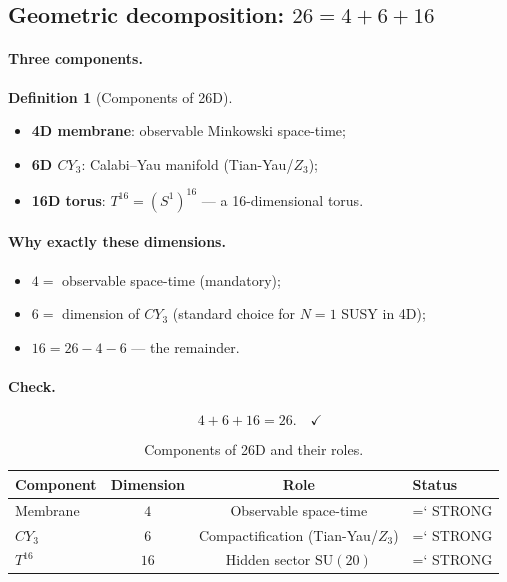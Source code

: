 \documentclass[11pt,a4paper]{article}
\newcommand{\SU}{\mathrm{SU}}
\newcommand{\CY}{CY_3}
\renewcommand{\texttt}[1]{{\ttfamily\hyphenchar\font=`\- #1}}
\theoremstyle{definition}
\newtheorem{definition}[theorem]{Definition}
\begin{document}
\subsection{Geometric decomposition: $26 = 4 + 6 + 16$}
\label{subsec:geometric-decomposition}

\paragraph{Three components.}

\begin{definition}[Components of 26D]
\label{def:26d-components}
\begin{itemize}
    \item \textbf{4D membrane}: observable Minkowski space-time;
    \item \textbf{6D $\CY$}: Calabi--Yau manifold 
          (Tian-Yau/$Z_3$);
    \item \textbf{16D torus}: $T^{16} = (S^1)^{16}$ — a 16-dimensional torus.
\end{itemize}
\end{definition}

\paragraph{Why exactly these dimensions.}
\begin{itemize}
    \item $4 = $ observable space-time (mandatory);
    \item $6 = $ dimension of $\CY$ (standard choice for 
          $N = 1$ SUSY in 4D);
    \item $16 = 26 - 4 - 6$ — the remainder.
\end{itemize}

\paragraph{Check.}
\begin{equation}
    4 + 6 + 16 = 26. \quad \checkmark
\end{equation}

\begin{table}[htbp]
\centering
\caption{Components of 26D and their roles.}
\label{tab:26d-components}
\begin{tabular}{lccl}
\toprule
Component & Dimension & Role & Status \\ 
\midrule
Membrane & $4$ & Observable space-time & \texttt{STRONG} \\[0.3em]
$\CY$ & $6$ & Compactification (Tian-Yau/$Z_3$) & \texttt{STRONG} \\[0.3em]
$T^{16}$ & $16$ & Hidden sector $\SU(20)$ & \texttt{STRONG} \\ 
\bottomrule
\end{tabular}
\end{table}
\end{document}
